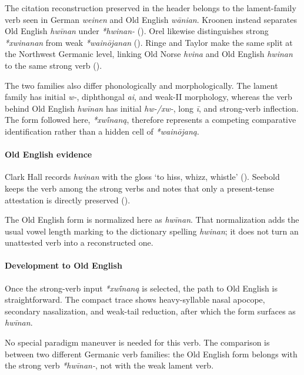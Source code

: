 \documentclass[
  british,
  a4paper,
]{article}
\begin{document}
The citation reconstruction preserved in the header belongs to the
lament-family verb seen in German \emph{weinen} and Old English
\emph{wānian}. Kroonen instead separates Old English \emph{hwīnan} under
\emph{*hwinan-} (). Orel
likewise distinguishes strong \emph{*xwinanan} from weak
\emph{*wainōjanan} (). Ringe and
Taylor make the same split at the Northwest Germanic level, linking Old
Norse \emph{hvina} and Old English \emph{hwinan} to the same strong verb
().

The two families also differ phonologically and morphologically. The
lament family has initial \emph{w-}, diphthongal \emph{ai}, and weak-II
morphology, whereas the verb behind Old English \emph{hwīnan} has
initial \emph{hw-/xw-}, long \emph{ī}, and strong-verb inflection. The
form followed here, \emph{*xwī́naną}, therefore represents a competing
comparative identification rather than a hidden cell of
\emph{*wainōjaną}.

\paragraph{Old English evidence}\label{old-english-evidence-35}

Clark Hall records \emph{hwinan} with the gloss `to hiss, whizz,
whistle' (). Seebold
keeps the verb among the strong verbs and notes that only a
present-tense attestation is directly preserved
().

The Old English form is normalized here as \emph{hwīnan}. That
normalization adds the usual vowel length marking to the dictionary
spelling \emph{hwinan}; it does not turn an unattested verb into a
reconstructed one.

\paragraph{Development to Old
English}\label{development-to-old-english-35}

Once the strong-verb input \emph{*xwī́naną} is selected, the path to Old
English is straightforward. The compact trace shows heavy-syllable nasal
apocope, secondary nasalization, and weak-tail reduction, after which
the form surfaces as \emph{hwīnan}.

No special paradigm maneuver is needed for this verb. The comparison is
between two different Germanic verb families: the Old English form
belongs with the strong verb \emph{*hwīnan-}, not with the weak lament
verb.
\end{document}

